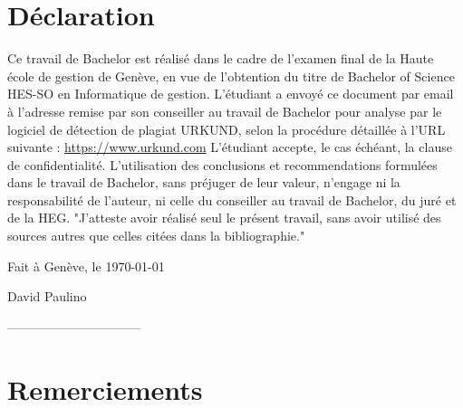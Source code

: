 \documentclass[12pt]{article}
\newcommand{\DP}{David Paulino}
\newcommand{\place}{Genève}
\begin{document}
\newpage

\section{Déclaration}
Ce travail de Bachelor est réalisé dans le cadre de l'examen final de la Haute école de gestion de Genève, en vue de l'obtention du titre de Bachelor of Science HES-SO en Informatique de gestion.
\newline\newline
L'étudiant a envoyé ce document par email à l'adresse remise par son conseiller au travail de Bachelor pour analyse par le logiciel de détection de plagiat URKUND, selon la procédure détaillée à l'URL suivante : \url{https://www.urkund.com}
\newline\newline
L'étudiant accepte, le cas échéant, la clause de confidentialité.
L'utilisation des conclusions et recommendations formulées dans le travail de Bachelor, sans préjuger de leur valeur, n'engage ni la responsabilité de l'auteur, ni celle du conseiller au travail de Bachelor, du juré et de la HEG.
\newline\newline
"J'atteste avoir réalisé seul le présent travail, sans avoir utilisé des sources autres que celles citées dans la bibliographie."
\vspace{4cm}
\begin{flushright}
    Fait à \place, le \today
\end{flushright}

\begin{flushright}
    \DP
\end{flushright}
\vspace{1cm}
\begin{flushright}
    --------------------------------
\end{flushright}


\newpage

\section{Remerciements}
\end{document}
